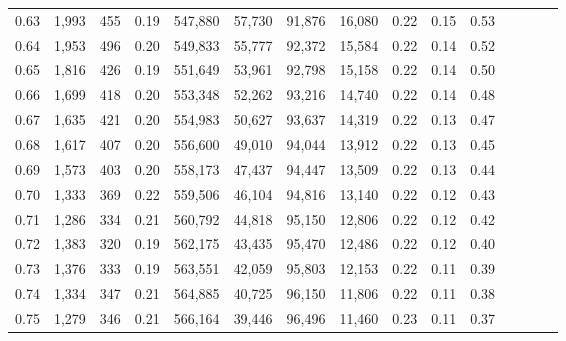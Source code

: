 \begin{tabular}{rrrcrrrrrrrrrrr}
0.63 &   1,993 &    455 &                                       0.19 &  547,880 &   57,730 &   91,876 &   16,080 &  0.22 &  0.15 &                         0.53 \\
0.64 &   1,953 &    496 &                                       0.20 &  549,833 &   55,777 &   92,372 &   15,584 &  0.22 &  0.14 &                         0.52 \\
0.65 &   1,816 &    426 &                                       0.19 &  551,649 &   53,961 &   92,798 &   15,158 &  0.22 &  0.14 &                         0.50 \\
0.66 &   1,699 &    418 &                                       0.20 &  553,348 &   52,262 &   93,216 &   14,740 &  0.22 &  0.14 &                         0.48 \\
0.67 &   1,635 &    421 &                                       0.20 &  554,983 &   50,627 &   93,637 &   14,319 &  0.22 &  0.13 &                         0.47 \\
0.68 &   1,617 &    407 &                                       0.20 &  556,600 &   49,010 &   94,044 &   13,912 &  0.22 &  0.13 &                         0.45 \\
0.69 &   1,573 &    403 &                                       0.20 &  558,173 &   47,437 &   94,447 &   13,509 &  0.22 &  0.13 &                         0.44 \\
0.70 &   1,333 &    369 &                                       0.22 &  559,506 &   46,104 &   94,816 &   13,140 &  0.22 &  0.12 &                         0.43 \\
0.71 &   1,286 &    334 &                                       0.21 &  560,792 &   44,818 &   95,150 &   12,806 &  0.22 &  0.12 &                         0.42 \\
0.72 &   1,383 &    320 &                                       0.19 &  562,175 &   43,435 &   95,470 &   12,486 &  0.22 &  0.12 &                         0.40 \\
0.73 &   1,376 &    333 &                                       0.19 &  563,551 &   42,059 &   95,803 &   12,153 &  0.22 &  0.11 &                         0.39 \\
0.74 &   1,334 &    347 &                                       0.21 &  564,885 &   40,725 &   96,150 &   11,806 &  0.22 &  0.11 &                         0.38 \\
0.75 &   1,279 &    346 &                                       0.21 &  566,164 &   39,446 &   96,496 &   11,460 &  0.23 &  0.11 &                         0.37 \\

\end{tabular}
